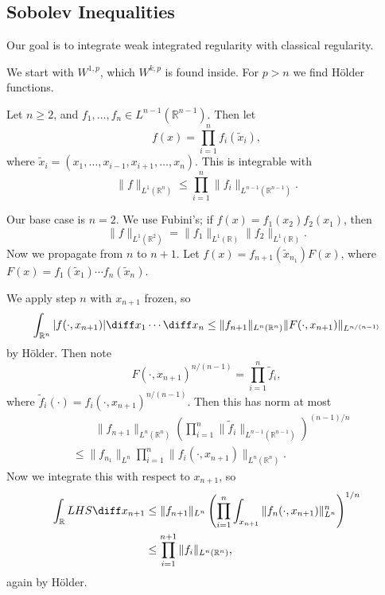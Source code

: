 \documentclass[12pt]{article}
\begin{document}

\subsection{Sobolev Inequalities}%
\label{sub:sobineq}

Our goal is to integrate weak integrated regularity with classical regularity.

We start with $W^{1, p}$, which $W^{k, p}$ is found inside. For $p > n$ we find H\"older functions.

\begin{lemma}
	Let $n \geq 2$, and $f_1, \ldots, f_n \in L^{n-1}(\mathbb{R}^{n-1})$. Then let
	\[
	f(x) = \prod_{i = 1}^n f_i(\tilde x_i),
	\]
	where $\tilde x_i = (x_1, \ldots, x_{i-1}, x_{i+1}, \ldots, x_n)$. This is integrable with
	\[
	\|f\|_{L^1(\mathbb{R}^n)} \leq \prod_{i = 1}^n \|f_i\|_{L^{n-1}(\mathbb{R}^{n-1})}.
	\]
\end{lemma}

\begin{proofbox}
	Our base case is $n = 2$. We use Fubini's; if $f(x) = f_1(x_2) f_2(x_1)$, then
	\[
	\|f\|_{L^1(\mathbb{R}^2)} = \|f_1\|_{L^1(\mathbb{R})} \|f_2\|_{L^1(\mathbb{R})}.
	\]
	Now we propagate from $n$ to $n + 1$. Let $f(x) = f_{n+1}(\tilde x_{n_1}) F(x)$, where $F(x) = f_1(\tilde x_1) \cdots f_n(\tilde x_n)$.

	We apply step $n$ with $x_{n+1}$ frozen, so
	\[
	\int_{\mathbb{R}^n} |f(\cdot, x_{n+1})| \diff x_1 \cdots \diff x_n \leq \|f_{n+1}\|_{L^n(\mathbb{R}^n)} \|F(\cdot, x_{n+1})\|_{L^{n/(n-1)}}
	\]
	by H\"older. Then note
	\[
	F(\cdot, x_{n+1})^{n/(n-1)} = \prod_{i=  1}^n \tilde f_i,
	\]
	where $\tilde f_i(\cdot) = f_i(\cdot, x_{n+1})^{n/(n-1)}$. Then this has norm at most
	\begin{align*}
	& \qquad\|f_{n+1}\|_{L^{n}(\mathbb{R}^{n})} \left( \prod_{i = 1}^n \|\tilde f_i\|_{L^{n-1}(\mathbb{R}^{n-1})} \right)^{(n-1)/n} \\
	&\leq \|f_{n_1}\|_{L^n} \prod_{i = 1}^n \|f_i(\cdot, x_{n+1})\|_{L^n(\mathbb{R}^n)}.
	\end{align*}
	Now we integrate this with respect to $x_{n+1}$, so
	\begin{align*}
		\int_{\mathbb{R}} LHS \diff x_{n+1} &\leq \|f_{n+1}\|_{L^n} \left( \prod_{i = 1}^n \int_{x_{n+1}} \|f_n(\cdot, x_{n+1})\|_{L^n}^n \right)^{1/n} \\
						    &\leq \prod_{i = 1}^{n+1} \|f_i\|_{L^{n}(\mathbb{R}^{n})},
	\end{align*}
	again by H\"older.
\end{proofbox}
\end{document}
